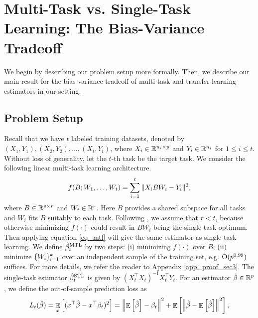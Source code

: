 \section{Multi-Task vs. Single-Task Learning: The Bias-Variance Tradeoff}
\label{sec_main}

We begin by describing our problem setup more formally.
Then, we describe our main result for the bias-variance tradeoff of multi-task and transfer learning estimators in our setting.

\subsection{Problem Setup}\label{sec_setup}

Recall that we have $t$ labeled training datasets, denoted by $(X_1, Y_1), (X_2, Y_2), \dots, (X_t, Y_t)$, where $X_i\in\mathbb{R}^{n_i\times p}$ and $Y_i\in\mathbb{R}^{n_i}$ for $1\le i\le t$.
Without loss of generality, let the $t$-th task be the target task.
We consider the following linear multi-task learning architecture.
\begin{align}
	\label{eq_mtl}
	f(B; W_1, \dots, W_t) = \sum_{i=1}^t \|X_i B W_i - Y_i\|^2,
\end{align}
where $B\in\mathbb{R}^{p\times r}$ and $W_i\in\mathbb{R}^r$.
Here $B$ provides a shared subspace for all tasks and $W_i$ fits $B$ suitably to each task.
Following \cite{WZR20}, we assume that $r < t$, because otherwise minimizing $f(\cdot)$ could result in $BW_i$ being the single-task optimum.
Then applying equation \eqref{eq_mtl} will give the same estimator as single-task learning.
We define $\hat{\beta}_t^{\text{MTL}}$ by two steps:
(i) minimizing $f(\cdot)$ over $B$;
(ii) minimize $\{W_i\}_{i=1}^k$ over an independent sample of the training set, e.g. $\operatorname{O}(p^{0.99})$ suffices.
For more details, we refer the reader to Appendix \ref{app_proof_sec3}. The single-task estimator $\hat{\beta}_t^{\text{STL}}$ is given by $(X_t^{\top}X_t)^{-1}X_t^{\top}Y_t$. 
For an estimator $\hat{\beta}\in\mathbb{R}^p$, we define the out-of-sample prediction loss as
	\begin{align*}
		L_t(\hat{\beta}) = \mathop{\mathbb{E}}_{x}\left[ ({x}^{\top}\hat{\beta} - {x}^{\top}\beta_t)^2 \right]
		= \left\| \mathop{\mathbb{E}}\left[ \hat{\beta} \right] - \beta_t \right\|^2 + \mathop{\mathbb{E}}\left[ \left\| \hat{\beta} - \mathop{\mathbb{E}}\left[ \hat{\beta} \right] \right\|^2 \right],
	\end{align*}
